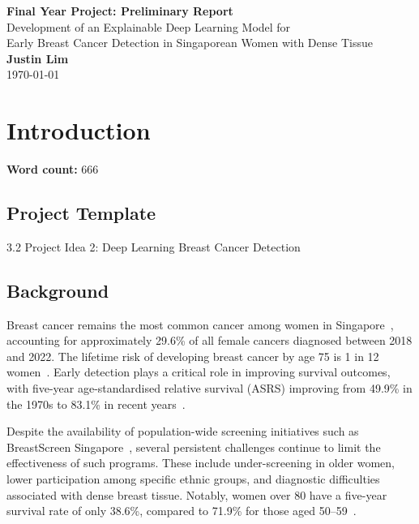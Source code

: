 \documentclass[12pt]{article}
\begin{document}
\begin{titlepage}
    \centering
    \vspace*{\fill}

    {\LARGE \textbf{Final Year Project: Preliminary Report}}\\[2em]
    {\large Development of an Explainable Deep Learning Model for}\\[0.5em]
    {\large Early Breast Cancer Detection in Singaporean Women with Dense Tissue}\\[4em]

    {\large \textbf{Justin Lim}}\\[1em]
    {\large \today}

    \vspace*{\fill}
\end{titlepage}
\newpage
\tableofcontents
\newpage

\newpage
\section{Introduction}
\label{chapter1}
\noindent\textbf{Word count:} 666
\vspace{1em}

\subsection{Project Template}
3.2 Project Idea 2: Deep Learning Breast Cancer Detection

\subsection{Background}

Breast cancer remains the most common cancer among women in Singapore~\cite{10}, accounting for approximately 29.6\% of all female cancers diagnosed between 2018 and 2022. The lifetime risk of developing breast cancer by age 75 is 1 in 12 women~\cite{10}. Early detection plays a critical role in improving survival outcomes, with five-year age-standardised relative survival (ASRS) improving from 49.9\% in the 1970s to 83.1\% in recent years~\cite{10}.

Despite the availability of population-wide screening initiatives such as BreastScreen Singapore~\cite{6}, several persistent challenges continue to limit the effectiveness of such programs. These include under-screening in older women, lower participation among specific ethnic groups, and diagnostic difficulties associated with dense breast tissue. Notably, women over 80 have a five-year survival rate of only 38.6\%, compared to 71.9\% for those aged 50--59~\cite{10}. 
\end{document}
